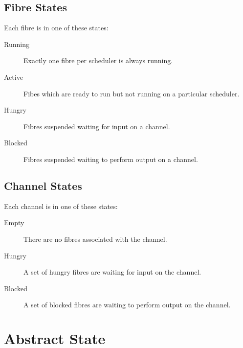 \documentclass[oneside]{book}
\begin{document}
\subsection{Fibre States}
Each fibre is in one of these states:
\begin{description}
\item[Running] Exactly one fibre per scheduler is always running.
\item[Active] Fibes which are ready to run but not running on a particular scheduler.
\item[Hungry] Fibres suspended waiting for input on a channel.
\item[Blocked] Fibres suspended waiting to perform output on a channel.
\end{description}

\subsection{Channel States}
Each channel is in one of these states:
\begin{description}
\item[Empty] There are no fibres associated with the channel.
\item[Hungry] A set of hungry fibres are waiting for input on the channel.
\item[Blocked] A set of blocked fibres are waiting to perform output on the channel.
\end{description}


\section{Abstract State}
\end{document}

